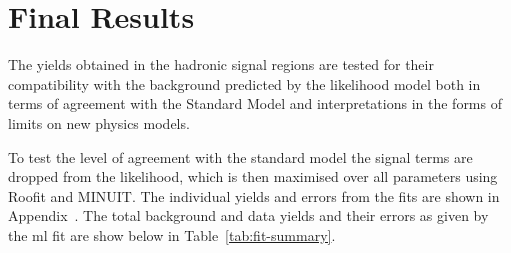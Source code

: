 \section{Final Results} %
\label{sec:final_results}
The yields obtained in the hadronic signal regions are tested for their 
compatibility with the background predicted by the likelihood model both in 
terms of agreement with the Standard Model and interpretations in the forms of 
limits on new physics models.

To test the level of agreement with the standard model the signal terms are 
dropped from the likelihood, which is then maximised over all parameters using 
Roofit\cite{ROOSTATS} and MINUIT\cite{MINOS}. The individual yields and errors from the fits are shown in Appendix~. The total background and data yields and their 
errors as given by the \ac{ml} fit are show below in Table~\ref{tab:fit-summary}.

